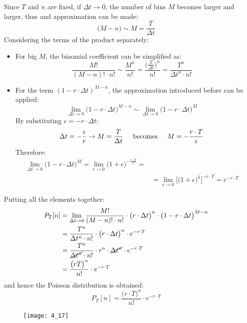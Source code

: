 Since \(T\) and \(n\) are fixed, if \(\Delta{t}\to{0}\), the number of bins \(M\) becomes larger and larger, thus and approximation can be made:
\begin{equation*}
    \bigl(M-n\bigr)\sim{M}=\frac{T}{\Delta{t}}
\end{equation*}
Considering the terms of the product separately:
\begin{itemize}
    \item For big \(M\), the binomial coefficient can be simplified as:
    \begin{equation*}
        \frac{M!}{(M-n)!\cdot{n!}}
        \sim\frac{M^n}{n!}
        =\frac{\bigl(\frac{T}{\Delta{t}}\bigr)^n}{n!}
        =\frac{T^n}{\Delta{t}^n\cdot{n!}}
    \end{equation*}
    \item For the term \((1-r\cdot\Delta t)^{M-n}\), the approximation introduced before can be applied:
    \begin{equation*}
         \lim_{\Delta{t}\to{0}}\bigl(1-r\cdot{\Delta{t}}\bigr)^{M-n}
         \sim\lim_{\Delta{t}\to{0}}\bigl(1-r\cdot{\Delta{t}}\bigr)^M
    \end{equation*}
    By substituting \(\epsilon=-r\cdot\Delta t\):
    \begin{equation*}
         \Delta t=-\frac{\epsilon}{r}\rightarrow M=\frac{T}{\Delta t}\hspace{0.5cm}\text{becomes}\hspace{0.5cm} M=-\frac{r\cdot T}{\epsilon}
    \end{equation*}
    Therefore:
    \begin{align*}
         \lim_{\Delta{t}\to{0}}\bigl(1-r\cdot{\Delta{t}}\bigr)^M=\lim_{\epsilon\to{0}}\bigl(1+\epsilon\bigr)^{-\frac{r\cdot{T}}{\epsilon}}=                     \\
     & =\lim_{\epsilon\to{0}}\biggl[\bigl(1+\epsilon\bigr)^{\frac{1}{\epsilon}}\biggr]^{-r\cdot{T}}
    =e^{-r\cdot{T}}
    \end{align*}
\end{itemize}
Putting all the elements together:
\begin{align*}
    P_T[n]
     & =\lim_{\Delta{t}\to{0}}\frac{M!}{(M-n)!\cdot{n!}}\cdot{\bigl(r\cdot{\Delta{t}}\bigr)^n}\cdot{\bigl(1-r\cdot{\Delta{t}}\bigr)^{M-n}} \\
     & =\frac{T^n}{\Delta{t}^n\cdot{n!}}\cdot{\bigl(r\cdot{\Delta{t}}\bigr)^n}\cdot{e^{-r\cdot{T}}}                                        \\
     & =\frac{T^n}{\cancel{\Delta{t}^n}\cdot{n!}}\cdot{r^n\cdot{\cancel{\Delta{t}^n}}}\cdot{e^{-r\cdot{T}}}                                \\
     & =\frac{\bigl(rT\bigr)^n}{n!}\cdot{e^{-r\cdot T}}
\end{align*}
and hence the Poisson distribution is obtained:
\begin{equation*}
    P_T[n]=\frac{\bigl(r\cdot T\bigr)^n}{n!}\cdot{e^{-r\cdot T}}
\end{equation*}
\begin{figure}[H]
    \texttt{[image: 4\_17]}
    \centering
\end{figure}
